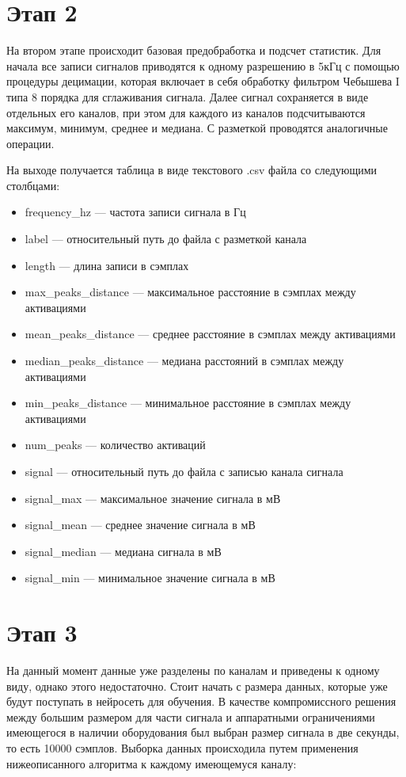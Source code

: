 \section{Этап 2}

На втором этапе происходит базовая предобработка и подсчет статистик. Для
начала все записи сигналов приводятся к одному разрешению в 5кГц с помощью
процедуры децимации, которая включает в себя обработку фильтром Чебышева I типа
8 порядка для сглаживания сигнала. Далее сигнал сохраняется в виде отдельных
его каналов, при этом для каждого из каналов подсчитываются максимум, минимум,
среднее и медиана. С разметкой проводятся аналогичные операции.

На выходе получается таблица в виде текстового .csv файла со следующими столбцами:

\begin{itemize}
	\item frequency\_hz --- частота записи сигнала в Гц
	\item label --- относительный путь до файла с разметкой канала
	\item length --- длина записи в сэмплах
	\item max\_peaks\_distance --- максимальное расстояние в сэмплах между активациями
	\item mean\_peaks\_distance --- среднее расстояние в сэмплах между активациями
	\item median\_peaks\_distance --- медиана расстояний в сэмплах между активациями
	\item min\_peaks\_distance --- минимальное расстояние в сэмплах между активациями
	\item num\_peaks --- количество активаций
	\item signal --- относительный путь до файла с записью канала сигнала
	\item signal\_max --- максимальное значение сигнала в мВ
	\item signal\_mean --- среднее значение сигнала в мВ
	\item signal\_median --- медиана сигнала	в мВ
	\item signal\_min --- минимальное значение сигнала в мВ
\end{itemize}

\section{Этап 3} На данный момент данные уже разделены по каналам и приведены к
одному виду, однако этого недостаточно. Стоит начать с размера данных, которые
уже будут поступать в нейросеть для обучения. В качестве компромиссного решения
между большим размером для части сигнала и аппаратными ограничениями имеющегося
в наличии оборудования был выбран размер сигнала в две секунды, то есть 10000
сэмплов. Выборка данных происходила путем применения нижеописанного алгоритма к
каждому имеющемуся каналу:

